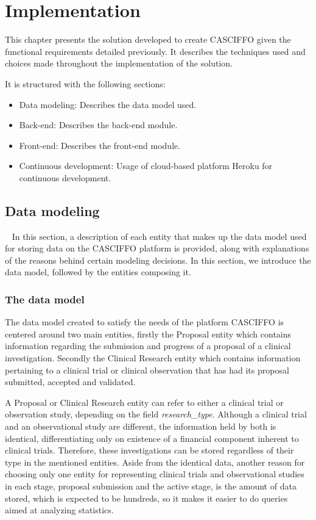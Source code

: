 % 
%
\chapter{Implementation}\label{ch:implementation}

This chapter presents the solution developed to create CASCIFFO given the functional requirements detailed previously. It describes the techniques used and choices made throughout the implementation of the solution.

It is structured with the following sections:
\begin{itemize}
    \item Data modeling: Describes the data model used. 
    \item Back-end: Describes the back-end module.
    \item Front-end: Describes the front-end module.
    \item Continuous development: Usage of cloud-based platform Heroku for continuous development.
\end{itemize}

\section{Data modeling}~\label{sec:data-model}
In this section, a description of each entity that makes up the data model used for storing data on the CASCIFFO platform is provided, along with explanations of the reasons behind certain modeling decisions.
In this section, we introduce the data model, followed by the entities composing it.

\subsection{The data model}

The data model created to satisfy the needs of the platform CASCIFFO is centered around two main entities, firstly the Proposal entity which contains information regarding the submission and progress of a proposal of a clinical investigation. Secondly the Clinical Research entity which contains information pertaining to a clinical trial or clinical observation that has had its proposal submitted, accepted and validated.

A Proposal or Clinical Research entity can refer to either a clinical trial or observation study, depending on the field \textit{research\_type}. Although a clinical trial and an observational study are different, the information held by both is identical, differentiating only on existence of a financial component inherent to clinical trials. Therefore, these investigations can be stored regardless of their type in the mentioned entities. Aside from the identical data, another reason for choosing only one entity for representing clinical trials and observational studies in each stage, proposal submission and the active stage, is the amount of data stored, which is expected to be hundreds, so it makes it easier to do queries aimed at analyzing statistics.


